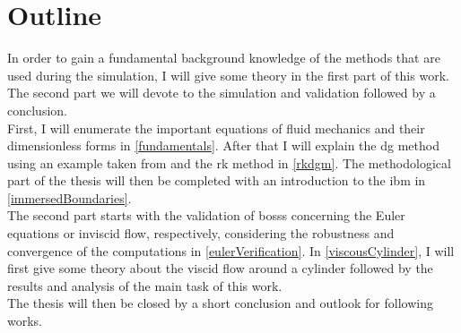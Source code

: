\section{Outline}
In order to gain a fundamental background knowledge of the methods that are used during the simulation, I will give some theory in the first part of this work. The second part we will devote to the simulation and validation followed by a conclusion. \\ \indent
First, I will enumerate the important equations of fluid mechanics and their dimensionless forms in \cref{fundamentals}. After that I will explain the \gls{dg} method using an example taken from \cite{mueller2014} and the \gls{rk} method in  \cref{rkdgm}. The methodological part of the thesis will then be completed with an introduction to the \gls{ibm} in \cref{immersedBoundaries}. \\ \indent
The second part starts with the validation of \gls{bosss} concerning the Euler equations or inviscid flow, respectively, considering the robustness and convergence of the computations in \cref{eulerVerification}. In  \cref{viscousCylinder}, I will first give some theory about the viscid flow around a cylinder followed by the results and analysis of the main task of this work. \\ \indent
The thesis will then be closed by a short conclusion and outlook for following works.







































